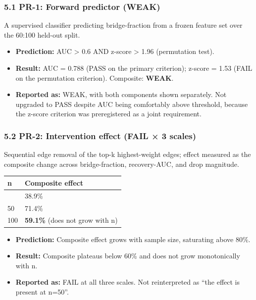 \documentclass[
]{article}
\newcounter{none} %
\providecommand{\tightlist}{%
  \setlength{\itemsep}{0pt}\setlength{\parskip}{0pt}}
\begin{document}
\subsubsection{5.1 PR-1: Forward predictor
(WEAK)}\label{pr-1-forward-predictor-weak}

A supervised classifier predicting bridge-fraction from a frozen feature
set over the 60:100 held-out split.

\begin{itemize}
\tightlist
\item
  \textbf{Prediction:} AUC \textgreater{} 0.6 AND z-score \textgreater{}
  1.96 (permutation test).
\item
  \textbf{Result:} AUC = 0.788 (PASS on the primary criterion); z-score
  = 1.53 (FAIL on the permutation criterion). Composite: \textbf{WEAK}.
\item
  \textbf{Reported as:} WEAK, with both components shown separately. Not
  upgraded to PASS despite AUC being comfortably above threshold,
  because the z-score criterion was preregistered as a joint
  requirement.
\end{itemize}

\subsubsection{5.2 PR-2: Intervention effect (FAIL × 3
scales)}\label{pr-2-intervention-effect-fail-3-scales}

Sequential edge removal of the top-k highest-weight edges; effect
measured as the composite change across bridge-fraction, recovery-AUC,
and drop magnitude.

{\def\LTcaptype{none} %
\begin{longtable}[]{@{}ll@{}}
\toprule\noalign{}
n & Composite effect \\
\midrule\noalign{}
\endhead
\bottomrule\noalign{}
\endlastfoot
10 & 38.9\% \\
50 & 71.4\% \\
100 & \textbf{59.1\%} (does not grow with n) \\
\end{longtable}
}

\begin{itemize}
\tightlist
\item
  \textbf{Prediction:} Composite effect grows with sample size,
  saturating above 80\%.
\item
  \textbf{Result:} Composite plateaus below 60\% and does not grow
  monotonically with n.
\item
  \textbf{Reported as:} FAIL at all three scales. Not reinterpreted as
  ``the effect is present at n=50''.
\end{itemize}
\end{document}
